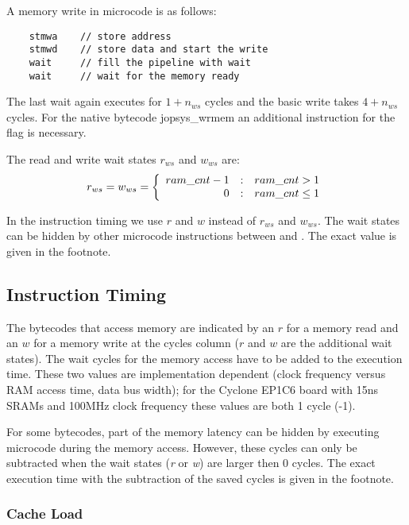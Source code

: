 A memory write in microcode is as follows:
\begin{verbatim}
    stmwa    // store address
    stmwd    // store data and start the write
    wait     // fill the pipeline with wait
    wait     // wait for the memory ready
\end{verbatim}
The last wait again executes for $1+n_{ws}$ cycles and the basic
write takes $4+n_{ws}$ cycles. For the native bytecode \code
{jopsys\_wrmem} an additional  instruction for the
 flag is necessary.

The read and write wait states $r_{ws}$ and $w_{ws}$ are:
\begin{equation*}
    r_{ws} = w_{ws} =
    \left\{\begin{array}{r@{\quad:\quad}l}
    ram\_cnt-1 & ram\_cnt>1 \\
    0   & ram\_cnt\le1
    \end{array} \right.
\end{equation*}

In the instruction timing we use $r$ and $w$ instead of $r_{ws}$ and
$w_{ws}$. The wait states can be hidden by other microcode
instructions between  and . The
exact value is given in the footnote.

\subsection*{Instruction Timing}

The bytecodes that access memory are indicated by an $r$ for a
memory read and an $w$ for a memory write at the cycles column ($r$
and $w$ are the additional wait states). The wait cycles for the
memory access have to be added to the execution time. These two
values are implementation dependent (clock frequency versus RAM
access time, data bus width); for the Cyclone EP1C6 board with 15ns
SRAMs and 100MHz clock frequency these values are both 1 cycle
(-1).

For some bytecodes, part of the memory latency can be hidden by
executing microcode during the memory access. However, these cycles
can only be subtracted when the wait states (\emph{r} or \emph{w})
are larger then 0 cycles. The exact execution time with the
subtraction of the saved cycles is given in the footnote.

\subsubsection*{Cache Load}


